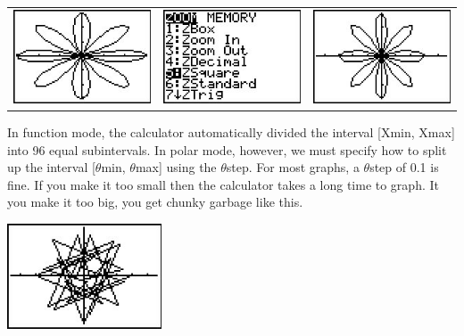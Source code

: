 \documentclass{ximera}
\begin{document}
\begin{center}

\begin{tabular}{ccc}

\includegraphics[width=1.8in]{./PolarGraphsGraphics/Polar06.jpg} &
\hspace{0.05in} \includegraphics[width=1.8in]{./PolarGraphsGraphics/Polar07.jpg} & 
\hspace{0.05in} \includegraphics[width=1.8in]{./PolarGraphsGraphics/Polar08.jpg} \\

\end{tabular} 

\end{center}

In function mode, the calculator automatically divided the interval [Xmin, Xmax] into 96 equal subintervals.  In polar mode, however, we must specify how to split up the interval [$\theta$min, $\theta$max] using the $\theta$step.  For most graphs, a $\theta$step of 0.1 is fine.  If you make it too small then the calculator takes a long time to graph.  It you make it too big, you get chunky garbage like this.

\begin{center}

\includegraphics[width=1.8in]{./PolarGraphsGraphics/Polar09.jpg} 

\end{center}
\end{document}
